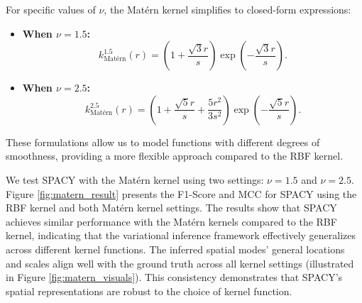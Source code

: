 For specific values of $\nu$, the Matérn kernel simplifies to closed-form expressions:

\begin{itemize}
    \item \textbf{When $\nu = 1.5$:}
    \[
    k_{\text{Matérn}}^{1.5}(r) = \left(1 + \frac{\sqrt{3} r}{s}\right) \exp\left(-\frac{\sqrt{3} r}{s}\right).
    \]
    \item \textbf{When $\nu = 2.5$:}
    \[
    k_{\text{Matérn}}^{2.5}(r) = \left(1 + \frac{\sqrt{5} r}{s} + \frac{5 r^2}{3 s^2}\right) \exp\left(-\frac{\sqrt{5} r}{s}\right).
    \]
\end{itemize}

These formulations allow us to model functions with different degrees of smoothness, providing a more flexible approach compared to the RBF kernel.


We test SPACY with the Matérn kernel using two settings: $\nu = 1.5$ and $\nu = 2.5$. Figure \ref{fig:matern_result} presents the F1-Score and MCC for SPACY using the RBF kernel and both Matérn kernel settings. The results show that SPACY achieves similar performance with the Matérn kernels compared to the RBF kernel, indicating that the variational inference framework effectively generalizes across different kernel functions. The inferred spatial modes' general locations and scales align well with the ground truth across all kernel settings (illustrated in Figure \ref{fig:matern_visuals}). This consistency demonstrates that SPACY's spatial representations are robust to the choice of kernel function.




